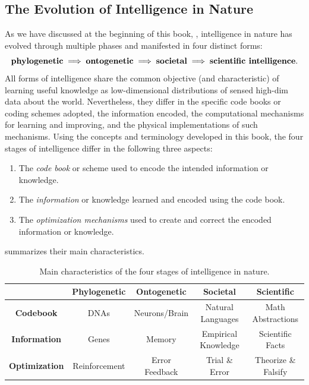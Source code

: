 \documentclass[../../book-main.tex]{subfiles}
\begin{document}
\subsection{The Evolution of Intelligence in Nature}
As we have discussed at the beginning of this book, ,
intelligence in nature has evolved through multiple phases and
manifested in four distinct forms:
\begin{equation}
    \text{\textbf{phylogenetic}} \;
    \Longrightarrow \; \text{\textbf{ontogenetic}} \;
    \Longrightarrow \; \text{\textbf{societal}} \;
    \Longrightarrow \; \text{\textbf{scientific intelligence}}.
\end{equation}
All forms of intelligence share the common objective (and
characteristic) of learning useful knowledge as low-dimensional
distributions of sensed high-dim data about the world.
Nevertheless, they differ in the specific code books or coding schemes adopted, the
information encoded, the computational mechanisms for learning and
improving, and the physical implementations of such mechanisms. Using
the concepts and terminology developed in this book, the four stages
of intelligence differ in the following three aspects:
\begin{enumerate}
    \item The \textit{code book} or scheme used to encode the
        intended information or knowledge.
    \item The \textit{information} or knowledge learned and encoded
        using the code book.
    \item The \textit{optimization mechanisms} used to create and
        correct the encoded information or knowledge.
\end{enumerate}
 summarizes their main characteristics.
\begin{table}[h]
    \centering
    \resizebox{1\columnwidth}{!}
    {
        \begin{tabular}{| c | c | c | c | c |}
            \hline & \textbf{Phylogenetic} & \textbf{Ontogenetic} &
            \textbf{Societal} & \textbf{Scientific}\\
            \hline

            \textbf{Codebook}  & DNAs & Neurons/Brain & Natural
            Languages & Math Abstractions \\ [0.5ex]
            \hline

            \textbf{Information} & Genes & Memory & Empirical
            Knowledge & Scientific Facts\\ [0.5ex]
            \hline
            \textbf{Optimization} & Reinforcement & Error Feedback &
            Trial \& Error & Theorize \& Falsify \\  [0.5ex]
            \hline
        \end{tabular}
    }
    \caption{Main characteristics of the four stages of intelligence in nature.}
    \label{tab:four-stage-intelligence}
\end{table}
\end{document}
